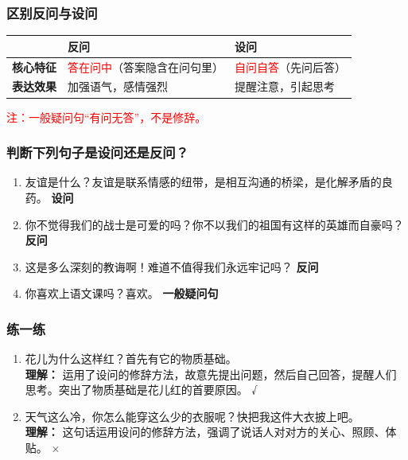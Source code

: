 \subsubsection*{区别反问与设问}

\begin{center}
    \renewcommand{\arraystretch}{1.8}
    \begin{tabular}{|>{\centering\arraybackslash}p{3cm}|>{\centering\arraybackslash}p{5.5cm}|>{\centering\arraybackslash}p{5.5cm}|}
        \hline
        & \textbf{反问} & \textbf{设问} \\
        \hline
        \textbf{核心特征} & \textcolor{red}{答在问中}（答案隐含在问句里） & \textcolor{red}{自问自答}（先问后答） \\
        \hline
        \textbf{表达效果} & 加强语气，感情强烈 & 提醒注意，引起思考 \\
        \hline
    \end{tabular}
\end{center}

\vspace{0.5cm}
\begin{center}
    \textcolor{red}{注：一般疑问句“有问无答”，不是修辞。}
\end{center}

\subsubsection*{判断下列句子是设问还是反问？}

\begin{enumerate}
    \item 友谊是什么？友谊是联系情感的纽带，是相互沟通的桥梁，是化解矛盾的良药。 \hfill \textbf{设问}
    \item 你不觉得我们的战士是可爱的吗？你不以我们的祖国有这样的英雄而自豪吗？ \hfill \textbf{反问}
    \item 这是多么深刻的教诲啊！难道不值得我们永远牢记吗？ \hfill \textbf{反问}
    \item 你喜欢上语文课吗？喜欢。 \hfill \textbf{一般疑问句}
\end{enumerate}

\subsubsection*{练一练}

\begin{enumerate}
    \item 花儿为什么这样红？首先有它的物质基础。 \\
    \textbf{理解：} 运用了设问的修辞方法，故意先提出问题，然后自己回答，提醒人们思考。突出了物质基础是花儿红的首要原因。 \hfill √

    \item 天气这么冷，你怎么能穿这么少的衣服呢？快把我这件大衣披上吧。 \\
    \textbf{理解：} 这句话运用设问的修辞方法，强调了说话人对对方的关心、照顾、体贴。 \hfill ×
\end{enumerate}

